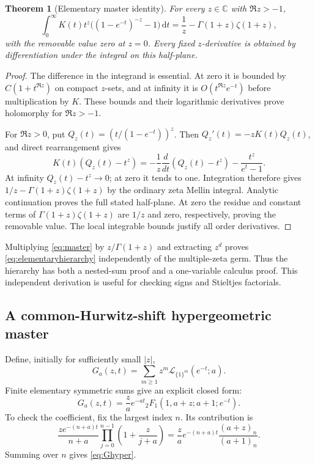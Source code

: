 \documentclass[11pt,a4paper]{article}
\numberwithin{equation}{section}
\newtheorem{theorem}{Theorem}[section]
\theoremstyle{definition}\newtheorem{definition}[theorem]{Definition}
\theoremstyle{remark}\newtheorem{remark}[theorem]{Remark}
\newcommand{\LL}{\mathcal L}
\newcommand{\dd}{\,\mathrm d}
\begin{document}
\begin{theorem}[Elementary master identity]\label{thm:master}
For every $z\in\mathbb C$ with $\Re z>-1$,
\begin{equation}\label{eq:master}
 \boxed{\displaystyle
 \int_0^\infty K(t)t^z\bigl((1-e^{-t})^{-z}-1\bigr)\dd t
       =\frac1z-\Gamma(1+z)\zeta(1+z),}
\end{equation}
with the removable value zero at $z=0$. Every fixed $z$-derivative is
obtained by differentiation under the integral on this half-plane.
\end{theorem}
\begin{proof}
The difference in the integrand is essential. At zero it is bounded by
$C(1+t^{\Re z})$ on compact $z$-sets, and at infinity it is
$O(t^{\Re z}e^{-t})$ before multiplication by $K$. These bounds and their
logarithmic derivatives prove holomorphy for $\Re z>-1$.

For $\Re z>0$, put $Q_z(t)=(t/(1-e^{-t}))^z$. Then
$Q_z'(t)=-zK(t)Q_z(t)$, and direct rearrangement gives
\[
 K(t)(Q_z(t)-t^z)
 =-\frac1z\frac{d}{dt}(Q_z(t)-t^z)-\frac{t^z}{e^t-1}.
\]
At infinity $Q_z(t)-t^z\to0$; at zero it tends to one. Integration
therefore gives $1/z-\Gamma(1+z)\zeta(1+z)$ by the ordinary zeta Mellin
integral. Analytic continuation proves the full stated half-plane. At
zero the residue and constant terms of $\Gamma(1+z)\zeta(1+z)$ are
$1/z$ and zero, respectively, proving the removable value. The local
integrable bounds justify all order derivatives.
\end{proof}

Multiplying \eqref{eq:master} by $z/\Gamma(1+z)$ and extracting
$z^d$ proves \eqref{eq:elementaryhierarchy} independently of the
multiple-zeta germ. Thus the hierarchy has both a nested-sum proof and
a one-variable calculus proof. This independent derivation is useful for
checking signs and Stieltjes factorials.

\subsection{A common-Hurwitz-shift hypergeometric master}
Define, initially for sufficiently small $|z|$,
\begin{equation}\label{eq:Gat}
 G_a(z,t)=\sum_{m\ge1}z^m\LL_{\{1\}^{m}}(e^{-t};a).
\end{equation}
Finite elementary symmetric sums give an explicit closed form:
\begin{equation}\label{eq:Ghyper}
 G_a(z,t)=\frac za e^{-at}
     {}_2F_1(1,a+z;a+1;e^{-t}).
\end{equation}
To check the coefficient, fix the largest index $n$. Its contribution is
\[
 \frac{z e^{-(n+a)t}}{n+a}
     \prod_{j=0}^{n-1}\left(1+\frac z{j+a}\right)
 =\frac za e^{-(n+a)t}\frac{(a+z)_n}{(a+1)_n}.
\]
Summing over $n$ gives \eqref{eq:Ghyper}.
\end{document}
